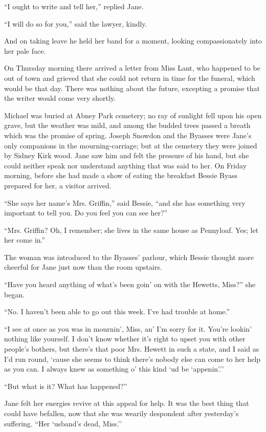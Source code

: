 ``I ought to write and tell her,'' replied Jane.

``I will do so for you,'' said the lawyer, kindly.

And on taking leave he held her band for a moment, looking
compassionately into her pale face.

On Thursday morning there arrived a letter from Miss Lant, who happened
to be out of town and grieved that she could not return in time for the
funeral, which would be that day. There was nothing about the future,
excepting a promise that the writer would come very shortly.

Michael was buried at Abney Park
{\protect\hypertarget{220}{}{}}cemetery; no ray of sunlight fell upon
his open grave, but the weather was mild, and among the budded trees
passed a breath which was the promise of spring. Joseph Snowdon and the
Byasses were Jane's only companions in the mourning-carriage; but at the
cemetery they were joined by Sidney Kirk wood. Jane saw him and felt the
pressure of his hand, but she could neither speak nor understand
anything that was said to her. On Friday morning, before she had made a
show of eating the breakfast Bessie Byass prepared for her, a visitor
arrived.

``She says her name's Mrs. Griffin,'' said Bessie, ``and she has
something very important to tell you. Do you feel you can see her?''

``Mrs. Griffin? Oh, I remember; she lives in the same house as
Pennyloaf. Yes; let her come in.''

The woman was introduced to the Byasses' parlour, which Bessie thought
more cheerful for Jane just now than the room upstairs.

``Have you heard anything of what's been goin' on with the Hewetts,
Miss?'' she began.

``No. I haven't been able to go out this week. I've had trouble at
home.''

{\protect\hypertarget{221}{}{}}``I see at once as you was in mournin',
Miss, an' I'm sorry for it. You're lookin' nothing like yourself. I
don't know whether it's right to upset you with other people's bothers,
but there's that poor Mrs. Hewett in such a state, and I said as I'd run
round, `cause she seems to think there's nobody else can come to her
help as you can. I always knew as something o' this kind `ud be
`appenin'.''

``But what is it? What has happened?''

Jane felt her energies revive at this appeal for help. It was the best
thing that could have befallen, now that she was wearily despondent
after yesterday's suffering. ``Her `usband's dead, Miss.''

